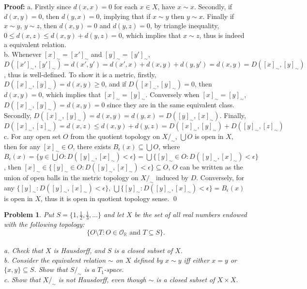 \documentclass[12pt]{article}
\newtheorem{problem}{Problem}
\begin{document}
\textbf{Proof:} a. Firstly since $d(x,x)=0$ for each $x\in X$, have $x\sim x$. Secondly, if $d(x,y)=0$, then $d(y,x)=0$, implying that if $x\sim y$ then $y\sim x$. Finally if $x\sim y$, $y\sim z$, then $d(x,y)=0$ and $d(y,z)=0$, by triangle inequality, $0\leq d(x,z)\leq d(x,y)+d(y,z)=0$, which implies that $x\sim z$, thus is indeed a equivalent relation. \\
\indent b. Whenever $[x]_\sim=[x']_\sim$ and $[y]_{\sim}=[y']_\sim$, $D([x']_\sim,[y']_\sim)=d(x',y')=d(x',x)+d(x,y)+d(y,y')=d(x,y)=D([x]_\sim,[y]_\sim)$, thus is well-defined. To show it is a metric, firstly, $D([x]_\sim, [y]_\sim)=d(x,y)\geq 0$, and if $D([x]_\sim,[y]_\sim)=0$, then $d(x,y)=0$, which implies that $[x]_\sim=[y]_\sim$. Conversely when $[x]_\sim=[y]_\sim$, $D([x]_\sim, [y]_\sim)=d(x,y)=0$ since they are in the same equivalent class. Secondly, $D([x]_\sim,[y]_\sim)=d(x,y)=d(y,x)=D([y]_\sim, [x]_\sim)$. Finally, $D([x]_\sim, [z]_\sim)=d(x,z)\leq d(x,y)+d(y,z)=D([x]_\sim, [y]_\sim)+D([y]_\sim, [z]_\sim)$ \\
\indent c. For any open set $O$ from the quotient topology on $X/_\sim$, $\bigcup O$ is open in $X$, then for any $[x]_\sim\in O$, there exists $B_{\epsilon}(x)\subseteq\bigcup O$, where $B_\epsilon(x)=\{y\in\bigcup O: D([y]_\sim, [x]_\sim)<\epsilon\}=\bigcup\{[y]_\sim\in O: D([y]_\sim, [x]_\sim)<\epsilon\}$, then $[x]_\sim\in\{[y]_\sim\in O: D([y]_\sim, [x]_\sim)<\epsilon\}\subseteq O$, $O$ can be written as the union of open balls in the metric topology on $X/_\sim$ induced by $D$. Conversely, for any $\{[y]_\sim: D([y]_\sim,[x]_\sim)<\epsilon\}$, $\bigcup\{[y]_\sim: D([y]_\sim,[x]_\sim)<\epsilon\}=B_\epsilon(x)$ is open in $X$, thus it is open in quotient topology sense. \qed
\\
\begin{problem}
Put $S=\{1, \frac{1}{2}, \frac{1}{3}, \dots\}$ and let $X$ be the set of all real numbers endowed with the following topology: \\
$$
\{O\setminus T: O\in\mathcal{O}_{\mathbb{R}}\text{ and } T\subseteq S\}.
$$\\
\indent a. Check that $X$ is Hausdorff, and $S$ is a closed subset of $X$. \\
\indent b. Consider the equivalent relation $\sim$ on $X$ defined by $x\sim y$ iff either $x=y$ or $\{x,y\}\subseteq S$. Show that $S/_\sim$ is a $T_1$-space. \\
\indent c. Show that $X/_\sim$ is not Hausdorff, even though $\sim$ is a closed subset of $X\times X$.
\end{problem}
\end{document}

